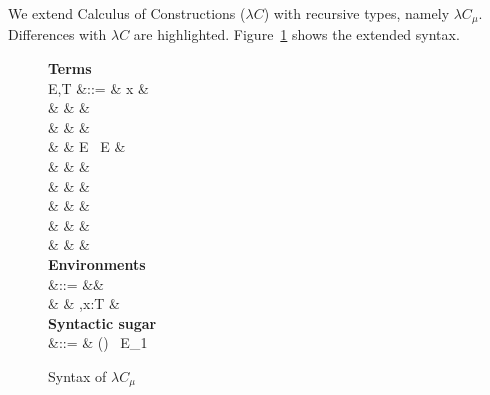 We extend Calculus of Constructions ($\lambda C$) with recursive
types, namely $\lambda C_{\mu}$. Differences with $\lambda C$ are
highlighted. Figure~\ref{fig:musyn} shows the extended syntax.

\begin{figure}[H]
  \small
  \begin{syntax}
    \textbf{Terms} \\
    E,T &::= & x &  \\
    & \mid & \star &  \\
    & \mid & \square &  \\
    & \mid & E \ E &  \\
    & \mid &  &  \\
    & \mid &  &  \\
    & \mid &  &  \\
    & \mid &  &  \\
    & \mid &  &  \\
    \textbf{Environments} \\
    \Gamma &::= &\varnothing &  \\
    & \mid & \Gamma,x:T &  \\
    \textbf{Syntactic sugar} \\
     &::= & () \ E_{1}
  \end{syntax}
  \caption{Syntax of $\lambda C_\mu$}\label{fig:musyn}
\end{figure}

